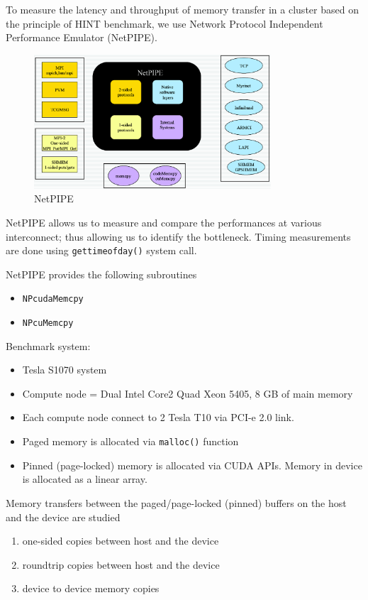 To measure the latency and throughput of memory transfer in a cluster
based on the principle of HINT benchmark, we use Network Protocol
Independent Performance Emulator (NetPIPE).

\begin{figure}[hbt]
  \centerline{\includegraphics[height=5cm,
    angle=0]{./images/NetPIPE.eps}}
  \caption{NetPIPE}
  \label{fig:NetPIPE}
\end{figure}

NetPIPE allows us to measure and compare the performances at various
interconnect; thus allowing us to identify the bottleneck. Timing
measurements are done using \verb!gettimeofday()! system call.

NetPIPE provides the following subroutines
\begin{itemize}
\item \verb!NPcudaMemcpy!
\item \verb!NPcuMemcpy!
\end{itemize}



Benchmark system:
\begin{itemize}
\item Tesla S1070 system
\item Compute node = Dual Intel Core2 Quad Xeon 5405, 8 GB of main
  memory
\item Each compute node connect to 2 Tesla T10 via PCI-e 2.0 link.
\end{itemize}

\begin{itemize}
\item Paged memory is allocated via \verb!malloc()! function

\item Pinned (page-locked) memory is allocated via CUDA APIs. Memory
  in device is allocated as a linear array.
\end{itemize}
Memory transfers between the paged/page-locked (pinned) buffers on the
host and the device are studied
\begin{enumerate}
\item one-sided copies between host and the device
\item  roundtrip copies between host and the device
\item device to device memory copies
\end{enumerate}

